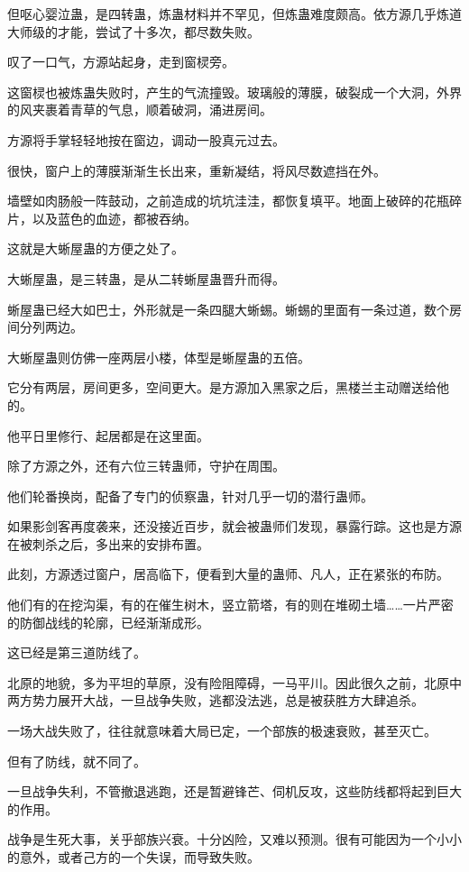 \begin{this_body}
但呕心婴泣蛊，是四转蛊，炼蛊材料并不罕见，但炼蛊难度颇高。依方源几乎炼道大师级的才能，尝试了十多次，都尽数失败。

叹了一口气，方源站起身，走到窗棂旁。

这窗棂也被炼蛊失败时，产生的气流撞毁。玻璃般的薄膜，破裂成一个大洞，外界的风夹裹着青草的气息，顺着破洞，涌进房间。

方源将手掌轻轻地按在窗边，调动一股真元过去。

很快，窗户上的薄膜渐渐生长出来，重新凝结，将风尽数遮挡在外。

墙壁如肉肠般一阵鼓动，之前造成的坑坑洼洼，都恢复填平。地面上破碎的花瓶碎片，以及蓝色的血迹，都被吞纳。

这就是大蜥屋蛊的方便之处了。

大蜥屋蛊，是三转蛊，是从二转蜥屋蛊晋升而得。

蜥屋蛊已经大如巴士，外形就是一条四腿大蜥蜴。蜥蜴的里面有一条过道，数个房间分列两边。

大蜥屋蛊则仿佛一座两层小楼，体型是蜥屋蛊的五倍。

它分有两层，房间更多，空间更大。是方源加入黑家之后，黑楼兰主动赠送给他的。

他平日里修行、起居都是在这里面。

除了方源之外，还有六位三转蛊师，守护在周围。

他们轮番换岗，配备了专门的侦察蛊，针对几乎一切的潜行蛊师。

如果影剑客再度袭来，还没接近百步，就会被蛊师们发现，暴露行踪。这也是方源在被刺杀之后，多出来的安排布置。

此刻，方源透过窗户，居高临下，便看到大量的蛊师、凡人，正在紧张的布防。

他们有的在挖沟渠，有的在催生树木，竖立箭塔，有的则在堆砌土墙……一片严密的防御战线的轮廓，已经渐渐成形。

这已经是第三道防线了。

北原的地貌，多为平坦的草原，没有险阻障碍，一马平川。因此很久之前，北原中两方势力展开大战，一旦战争失败，逃都没法逃，总是被获胜方大肆追杀。

一场大战失败了，往往就意味着大局已定，一个部族的极速衰败，甚至灭亡。

但有了防线，就不同了。

一旦战争失利，不管撤退逃跑，还是暂避锋芒、伺机反攻，这些防线都将起到巨大的作用。

战争是生死大事，关乎部族兴衰。十分凶险，又难以预测。很有可能因为一个小小的意外，或者己方的一个失误，而导致失败。


\end{this_body}
